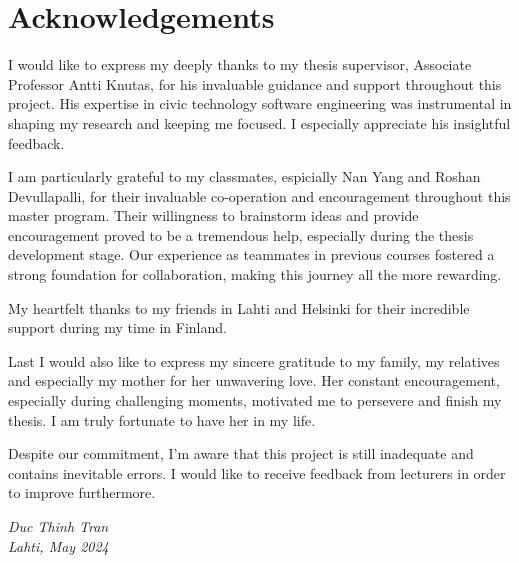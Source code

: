 \section*{Acknowledgements}

I would like to express my deeply thanks to my thesis supervisor, Associate Professor Antti Knutas, for his invaluable guidance and support throughout this project. His expertise in civic technology software engineering was instrumental in shaping my research and keeping me focused. I especially appreciate his insightful feedback.

I am particularly grateful to my classmates, espicially Nan Yang and Roshan Devullapalli, for their invaluable co-operation and encouragement throughout this master program. Their willingness to brainstorm ideas and provide encouragement proved to be a tremendous help, especially during the thesis development stage. Our experience as teammates in previous courses fostered a strong foundation for collaboration, making this journey all the more rewarding.

My heartfelt thanks to my friends in Lahti and Helsinki for their incredible support during my time in Finland.

Last I would also like to express my sincere gratitude to my family, my relatives and especially my mother for her unwavering love. Her constant encouragement, especially during challenging moments, motivated me to persevere and finish my thesis. I am truly fortunate to have her in my life.

Despite our commitment, I'm aware that this project is still inadequate and contains inevitable errors. I would like to receive feedback from lecturers in order to improve furthermore.

\textit{Duc Thinh Tran} \\
\textit{Lahti, May 2024}



\clearpage %

